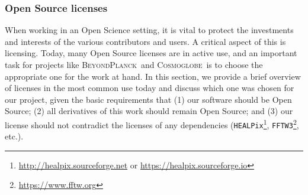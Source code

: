 \documentclass[twocolumn]{openjournal}
\newcommand{\BP}{\textsc{BeyondPlanck}}
\newcommand{\cosmoglobe}{\textsc{Cosmoglobe}}
\begin{document}
\subsubsection{Open Source licenses}

When working in an Open Science setting, it is vital to protect the investments
and interests of the various contributors and users. A critical aspect of this
is licensing. Today, many Open Source licenses are in active use, and an
important task for projects like \BP\ and \cosmoglobe\ is to choose the
appropriate one for the work at hand. In this section, we provide a brief
overview of licenses in the most common use today and discuss which one was
chosen for our project, given the basic requirements that (1) our software
should be Open Source; (2) all derivatives of this work should remain Open
Source; and (3) our license should not contradict the licenses of any
dependencies (\texttt{HEALPix}\footnote{\url{http://healpix.sourceforge.net} or
\url{https://healpix.sourceforge.io}},
\texttt{FFTW3}\footnote{\url{https://www.fftw.org}}, etc.).
\end{document}
